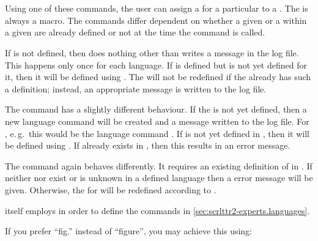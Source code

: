 \begin{Declaration}
    \\
    \\
\end{Declaration}
%
%
%
Using one of these commands, the user can assign a  for a
particular  to a .  The  is always a
macro. The commands differ dependent on whether a given  or a
 within a given  are already defined or not at the
time the command is called.

If  is not defined, then  does
nothing other than writes a message in the log file. This happens only once
for each language.  If  is defined but  is not yet
defined for it, then it will be defined using .  The
 will not be redefined if the  already has such a
definition; instead, an appropriate message is written to the log file.

The command  has a slightly different behaviour.  If the
 is not yet defined, then a new language command will be
created and a message written to the log file. For 
, e.\,g.\, this would be the language command
. If  is not yet defined in
, then it will be defined using .  If
 already exists in , then this results in an error
message.

The command  again behaves differently. It requires an
existing definition of  in .  If neither
 nor  exist or  is unknown in a
defined language then a error message will be given. Otherwise, the
 for  will be redefined according to
.

\KOMAScript{} itself employs  in order to define the
commands in \autoref{sec:scrlttr2-experts.languages}.

\begin{Example}
  If you prefer ``fig.'' instead of ``figure'', you may achieve this using:
\begin{lstcode}
\end{lstcode}
\end{Example}
  
